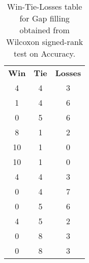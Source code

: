 \begin{table}
\centering
\caption{Win-Tie-Losses table for Gap filling obtained from Wilcoxon signed-rank test on Accuracy.}
\label{tab:gap_filling_model_comparison_Accuracy}
\begin{tabular}{|c|c|c|}
\toprule
 \textbf{Win} &  \textbf{Tie} &  \textbf{Losses} \\
            4 &             4 &                3 \\
\midrule
            1 &             4 &                6 \\
            0 &             5 &                6 \\
            8 &             1 &                2 \\
           10 &             1 &                0 \\
           10 &             1 &                0 \\
            4 &             4 &                3 \\
            0 &             4 &                7 \\
            0 &             5 &                6 \\
            4 &             5 &                2 \\
            0 &             8 &                3 \\
            0 &             8 &                3 \\
\bottomrule
\end{tabular}
\end{table}
